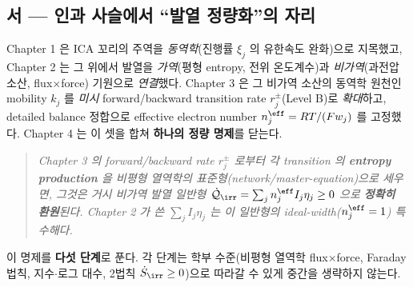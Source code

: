 \subsection*{서 — 인과 사슬에서 ``발열 정량화''의 자리}
Chapter 1 은 ICA 꼬리의 주역을 \emph{동역학}(진행률 $\xi_j$ 의 유한속도 완화)으로 지목했고, Chapter 2 는 그
위에서 발열을 \emph{가역}(평형 entropy, 전위 온도계수)과 \emph{비가역}(과전압 소산, flux$\times$force) 기원으로
\emph{연결}했다. Chapter 3 은 그 비가역 소산의 동역학 원천인 mobility $k_j$ 를 \emph{미시} forward/backward
transition rate $r_j^\pm$(Level B)로 \emph{확대}하고, detailed balance 정합으로 effective electron number
$n_j^{\eff}=RT/(Fw_j)$ 를 고정했다. Chapter 4 는 이 셋을 합쳐 \textbf{하나의 정량 명제}를 닫는다.
\begin{quote}\itshape
Chapter 3 의 forward/backward rate $r_j^\pm$ 로부터 각 transition 의 \textbf{entropy production} 을 비평형
열역학의 표준형(network/master-equation)으로 세우면, 그것은 거시 비가역 발열 \emph{일반형}
$\dot{\mathcal Q}_\irr=\sum_j n_j^{\eff}I_j\eta_j\ge0$ 으로 \textbf{정확히 환원}된다. Chapter 2 가 쓴
$\sum_j I_j\eta_j$ 는 이 일반형의 ideal-width($n_j^{\eff}=1$) 특수해다.
\end{quote}
이 명제를 \textbf{다섯 단계}로 푼다. 각 단계는 학부 수준(비평형 열역학 flux$\times$force, Faraday 법칙,
지수$\cdot$로그 대수, 2법칙 $\dot S_\irr\ge0$)으로 따라갈 수 있게 중간을 생략하지 않는다.
